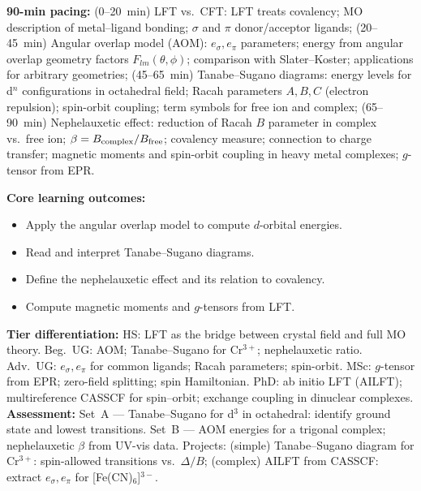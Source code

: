\documentclass[11pt,a4paper]{article}
\begin{document}
\medskip

\begin{tcolorbox}[chembox, title={Module~III.3 --- Lecture L09: Ligand Field Theory}]
\textbf{90-min pacing:} (0--20~min) LFT vs.\ CFT: LFT treats covalency; MO description of metal--ligand bonding; $\sigma$ and $\pi$ donor/acceptor ligands; (20--45~min) Angular overlap model (AOM): $e_\sigma,e_\pi$ parameters; energy from angular overlap geometry factors $F_{lm}(\theta,\phi)$; comparison with Slater--Koster; applications for arbitrary geometries; (45--65~min) Tanabe--Sugano diagrams: energy levels for d$^n$ configurations in octahedral field; Racah parameters $A,B,C$ (electron repulsion); spin-orbit coupling; term symbols for free ion and complex; (65--90~min) Nephelauxetic effect: reduction of Racah $B$ parameter in complex vs.\ free ion; $\beta=B_{\rm complex}/B_{\rm free}$; covalency measure; connection to charge transfer; magnetic moments and spin-orbit coupling in heavy metal complexes; $g$-tensor from EPR.

\medskip\textbf{Core learning outcomes:}
\begin{itemize}[leftmargin=1.4em,topsep=2pt,itemsep=1pt]
  \item Apply the angular overlap model to compute $d$-orbital energies.
  \item Read and interpret Tanabe--Sugano diagrams.
  \item Define the nephelauxetic effect and its relation to covalency.
  \item Compute magnetic moments and $g$-tensors from LFT.
\end{itemize}
\medskip\textbf{Tier differentiation:}
HS: LFT as the bridge between crystal field and full MO theory.
Beg.\ UG: AOM; Tanabe--Sugano for Cr$^{3+}$; nephelauxetic ratio.
Adv.\ UG: $e_\sigma,e_\pi$ for common ligands; Racah parameters; spin-orbit.
MSc: $g$-tensor from EPR; zero-field splitting; spin Hamiltonian.
PhD: ab initio LFT (AILFT); multireference CASSCF for spin--orbit; exchange coupling in dinuclear complexes.
\medskip\textbf{Assessment:}
Set~A --- Tanabe--Sugano for d$^3$ in octahedral: identify ground state and lowest transitions.
Set~B --- AOM energies for a trigonal complex; nephelauxetic $\beta$ from UV-vis data.
Projects: (simple) Tanabe--Sugano diagram for Cr$^{3+}$: spin-allowed transitions vs.\ $\Delta/B$; (complex) AILFT from CASSCF: extract $e_\sigma,e_\pi$ for [Fe(CN)$_6$]$^{3-}$.
\end{tcolorbox}

\medskip
\end{document}
